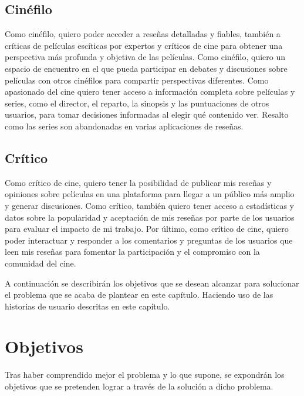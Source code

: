 \subsection{Cinéfilo}

Como cinéfilo, quiero poder acceder a reseñas detalladas y fiables, también a críticas de películas escíticas por expertos y críticos de cine para obtener una perspectiva más profunda y objetiva de las películas. Como cinéfilo, quiero un espacio de encuentro en el que pueda participar en debates y discusiones sobre películas con otros cinéfilos para compartir perspectivas diferentes. Como apasionado del cine quiero tener acceso a información completa sobre películas y series, como el director, el reparto, la sinopsis y las puntuaciones de otros usuarios, para tomar decisiones informadas al elegir qué contenido ver. Resalto como las series son abandonadas en varias aplicaciones de reseñas.

\subsection{Crítico}

Como crítico de cine, quiero tener la posibilidad de publicar mis reseñas y opiniones sobre películas en una plataforma para llegar a un público más amplio y generar discusiones. Como crítico, también quiero tener acceso a estadísticas y datos sobre la popularidad y aceptación de mis reseñas por parte de los usuarios para evaluar el impacto de mi trabajo. Por último, como crítico de cine, quiero poder interactuar y responder a los comentarios y preguntas de los usuarios que leen mis reseñas para fomentar la participación y el compromiso con la comunidad del cine.

A continuación se describirán los objetivos que se desean alcanzar para solucionar el problema que se 
acaba de plantear en este capítulo. Haciendo uso de las historias de usuario descritas en este capítulo.

\section{Objetivos}

Tras haber comprendido mejor el problema y lo que supone, se expondrán los objetivos que se pretenden 
lograr a través de la solución a dicho problema.

